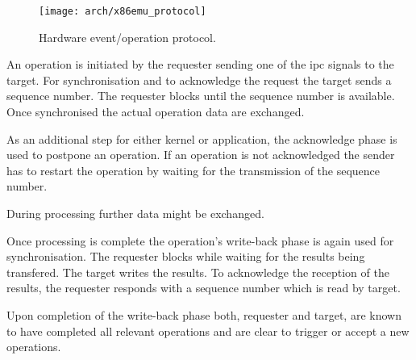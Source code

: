 		\begin{figure}[h]
			\centering	
			\texttt{[image: arch/x86emu\_protocol]}
			\caption{Hardware event/operation protocol.}
			\label{fig:x86emu_protocol}
		\end{figure}

		An operation is initiated by the requester sending one of the \gls{ipc} signals to the target. For synchronisation and to acknowledge the request the target sends a sequence number. The requester blocks until the sequence number is available. Once synchronised the actual operation data are exchanged.

		As an additional step for either kernel or application, the acknowledge phase is used to postpone an operation. If an operation is not acknowledged the sender has to restart the operation by waiting for the transmission of the sequence number.

		During processing further data might be exchanged.

		Once processing is complete the operation's write-back phase is again used for synchronisation. The requester blocks while waiting for the results being transfered. The target writes the results. To acknowledge the reception of the results, the requester responds with a sequence number which is read by target.

		Upon completion of the write-back phase both, requester and target, are known to have completed all relevant operations and are clear to trigger or accept a new operations.
